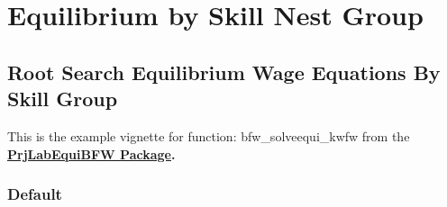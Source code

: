 \documentclass[
]{book}
\begin{document}
\hypertarget{equilibrium-by-skill-nest-group}{%
\chapter{Equilibrium by Skill Nest Group}\label{equilibrium-by-skill-nest-group}}

\hypertarget{root-search-equilibrium-wage-equations-by-skill-group}{%
\section{Root Search Equilibrium Wage Equations By Skill Group}\label{root-search-equilibrium-wage-equations-by-skill-group}}

This is the example vignette for function: bfw\_solveequi\_kwfw from the
\href{https://fanwangecon.github.io/PrjLabEquiBFW/}{\textbf{PrjLabEquiBFW
Package}}\textbf{.}

\hypertarget{default-1}{%
\subsection{Default}\label{default-1}}
\end{document}
